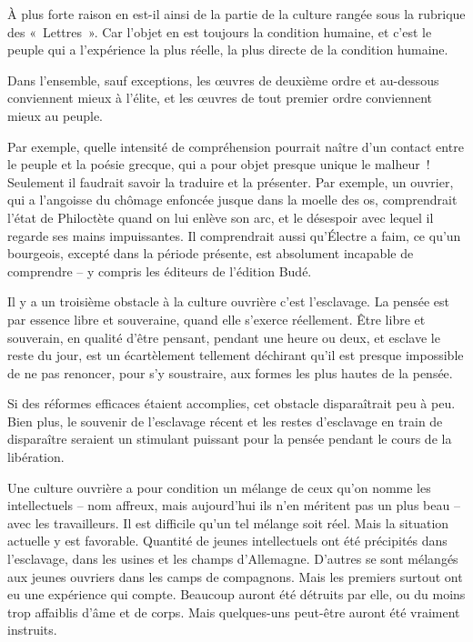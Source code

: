 \documentclass[french,twoside]{book} %
\begin{document}
À plus forte raison en est-il ainsi de la partie de la culture rangée sous la rubrique des « Lettres ». Car l'objet en est toujours la condition humaine, et c'est le peuple qui a l'expérience la plus réelle, la plus directe de la condition humaine.\par
Dans l'ensemble, sauf exceptions, les œuvres de deuxième ordre et au-dessous conviennent mieux à l'élite, et les œuvres de tout premier ordre conviennent mieux au peuple.\par
Par exemple, quelle intensité de compréhension pourrait naître d'un contact entre le peuple et la poésie grecque, qui a pour objet presque unique le malheur ! Seulement il faudrait savoir la traduire et la présenter. Par exemple, un ouvrier, qui a l'angoisse du chômage enfoncée jusque dans la moelle des os, comprendrait l'état de Philoctète quand on lui enlève son arc, et le désespoir avec lequel il regarde ses mains impuissantes. Il comprendrait aussi qu'Électre a faim, ce qu'un bourgeois, excepté dans la période présente, est absolument incapable de comprendre – y compris les éditeurs de l'édition Budé.\par
Il y a un troisième obstacle à la culture ouvrière c'est l’esclavage. La pensée est par essence libre et souveraine, quand elle s'exerce réellement. Être libre et souverain, en qualité d'être pensant, pendant une heure ou deux, et esclave le reste du jour, est un écartèlement tellement déchirant qu'il est presque impossible de ne pas renoncer, pour s'y soustraire, aux formes les plus hautes de la pensée.\par
Si des réformes efficaces étaient accomplies, cet obstacle disparaîtrait peu à peu. Bien plus, le souvenir de l'esclavage récent et les restes d'esclavage en train de disparaître seraient un stimulant puissant pour la pensée pendant le cours de la libération.\par
Une culture ouvrière a pour condition un mélange de ceux qu'on nomme les intellectuels – nom affreux, mais aujourd'hui ils n'en méritent pas un plus beau – avec les travailleurs. Il est difficile qu'un tel mélange soit réel. Mais la situation actuelle y est favorable. Quantité de jeunes intellectuels ont été précipités dans l'esclavage, dans les usines et les champs d'Allemagne. D'autres se sont mélangés aux jeunes ouvriers dans les camps de compagnons. Mais les premiers surtout ont eu une expérience qui compte. Beaucoup auront été détruits par elle, ou du moins trop affaiblis d'âme et de corps. Mais quelques-uns peut-être auront été vraiment instruits.\par
\end{document}
